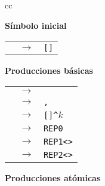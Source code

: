 \begin{figure}
\begin{center}
\begin{tabular}{cc}

    \begin{minipage}[t]{0.35\textwidth}
    {\bf Símbolo inicial}

    \medskip

    \begin{tabular}{rcl}
    \start & $\to$ & \verb#[#\inst\verb#]# %
    \end{tabular}

    \bigskip

    {\bf Producciones básicas}

    \medskip

    \begin{tabular}{rcl}
    \inst  & $\to$ & \atom %
    \\
    \inst  & $\to$ & \inst\verb#,#\inst %
    \\
    \inst  & $\to$ & \rep\verb#[#\inst\verb#]^#$k$%
    \\
    \rep  & $\to$ & \verb#REP0# %
    \\

    \rep  & $\to$ & \verb#REP1<#\atom\verb#># %
    \\
    \rep  & $\to$ & \verb#REP2<#\atom\verb#># %
    \\
    \end{tabular}
    \end{minipage}
    
    \begin{minipage}[t]{0.35\textwidth}

    {\bf Producciones atómicas}

    \medskip


\end{minipage}
\end{tabular}
\end{center}
\end{figure}
